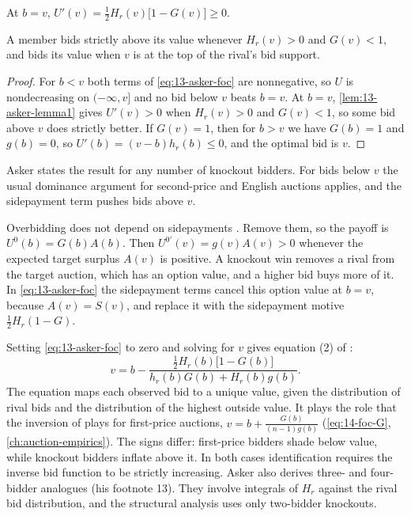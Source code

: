 \begin{lemma}\label{lem:13-asker-lemma1}
At $b=v$, $U'(v)=\frac{1}{2}H_r(v)\bigl[1-G(v)\bigr]\ge0$.
\end{lemma}

\begin{proposition}\label{prop:13-overbid}
A member bids strictly above its value whenever $H_r(v)>0$ and $G(v)<1$, and bids its value when $v$ is at the
top of the rival's bid support.
\end{proposition}

\begin{proof}
For $b<v$ both terms of \eqref{eq:13-asker-foc} are nonnegative, so $U$ is nondecreasing on $(-\infty,v]$ and
no bid below $v$ beats $b=v$. At $b=v$, \cref{lem:13-asker-lemma1} gives $U'(v)>0$ when $H_r(v)>0$ and
$G(v)<1$, so some bid above $v$ does strictly better. If $G(v)=1$, then for $b>v$ we have $G(b)=1$ and $g(b)=0$,
so $U'(b)=(v-b)h_r(b)\le0$, and the optimal bid is $v$.
\end{proof}

Asker states the result for any number of knockout bidders. For bids below $v$ the usual dominance argument for
second-price and English auctions applies, and the sidepayment term pushes bids above $v$.

\begin{remark}\label{rem:13-asker-nosidepay}
Overbidding does not depend on sidepayments \citep[footnote 15]{Asker2010}. Remove them, so the payoff is
$U^0(b)=G(b)A(b)$. Then $U^{0\prime}(v)=g(v)A(v)>0$ whenever the expected target surplus $A(v)$ is positive. A
knockout win removes a rival from the target auction, which has an option value, and a higher bid buys more of
it. In \eqref{eq:13-asker-foc} the sidepayment terms cancel this option value at $b=v$, because $A(v)=S(v)$, and
replace it with the sidepayment motive $\frac{1}{2}H_r(1-G)$.
\end{remark}

Setting \eqref{eq:13-asker-foc} to zero and solving for $v$ gives equation (2) of \citet{Asker2010}:
\begin{equation}\label{eq:13-asker-inverse}
v=b-\frac{\frac{1}{2}H_r(b)\bigl[1-G(b)\bigr]}{h_r(b)G(b)+H_r(b)g(b)} .
\end{equation}
The equation maps each observed bid to a unique value, given the distribution of rival bids and the distribution
of the highest outside value. It plays the role that the inversion of \citet{GuerrePerrigneVuong2000} plays for
first-price auctions, $v=b+\frac{G(b)}{(n-1)g(b)}$ (\cref{eq:14-foc-G}, \cref{ch:auction-empirics}). The signs
differ: first-price bidders shade below value, while knockout bidders inflate above it. In both cases
identification requires the inverse bid function to be strictly increasing. Asker also derives three- and
four-bidder analogues (his footnote 13). They involve integrals of $H_r$ against the rival bid distribution,
and the structural analysis uses only two-bidder knockouts.

